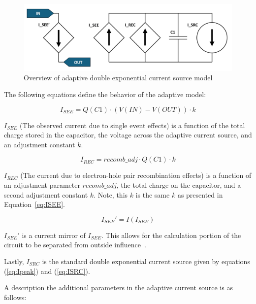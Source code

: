 \documentclass[conference]{IEEEtran}
\begin{document}
    \begin{figure}[htbp]
        \centering
        \includegraphics[width=0.95\linewidth]{Adaptive_Model_Cropped}
        \caption{Overview of adaptive double exponential current source model \cite{Kauppila2009}}
        \label{fig:adaptive_model_overview}
    \end{figure}

    The following equations define the behavior of the adaptive model:

    \begin{equation}
        I_{SEE} = Q(C1) \cdot (V(IN) - V(OUT)) \cdot k\label{eq:ISEE}
    \end{equation}

    \(I_{SEE}\) (The observed current due to single event effects) is a function of the total charge stored in the capacitor, the voltage across the adaptive current source, and an adjustment constant \(k\).

    \begin{equation}
        I_{REC} = recomb\_adj \cdot Q(C1) \cdot k\label{eq:IREC}
    \end{equation}

    \(I_{REC}\) (The current due to electron-hole pair recombination effects) is a function of an adjustment parameter \(recomb\_adj\), the total charge on the capacitor, and a second adjustment constant \(k\).
    Note, this \(k\) is the same \(k\) as presented in Equation~\ref{eq:ISEE}.

    \begin{equation}
        I_{SEE}' = I(I_{SEE})\label{eq:ISEE'}
    \end{equation}

    \(I_{SEE}'\) is a current mirror of \(I_{SEE}\).
    This allows for the calculation portion of the circuit to be separated from outside influence~\cite{Kauppila2009}.

    Lastly, \(I_{SRC}\) is the standard double exponential current source given by equations (\ref{eq:Ipeak}) and (\ref{eq:ISRC}).

    A description the additional parameters in the adaptive current source is as follows:
\end{document}
